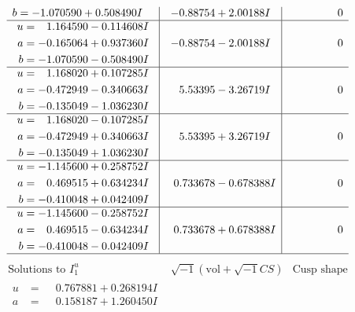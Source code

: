 \documentclass[1p]{elsarticle_modified}
\theoremstyle{definition}
\newcommand{\I}{\sqrt{-1}}
\begin{document}
$$\begin{array}{c|c|c}
\begin{aligned}
b &= -1.070590 + 0.508490 I\end{aligned}
 & -0.88754 + 2.00188 I & \phantom{-0.000000 } 0 \\ \hline\begin{aligned}
u &= \phantom{-}1.164590 - 0.114608 I \\
a &= -0.165064 + 0.937360 I \\
b &= -1.070590 - 0.508490 I\end{aligned}
 & -0.88754 - 2.00188 I & \phantom{-0.000000 } 0 \\ \hline\begin{aligned}
u &= \phantom{-}1.168020 + 0.107285 I \\
a &= -0.472949 - 0.340663 I \\
b &= -0.135049 - 1.036230 I\end{aligned}
 & \phantom{-}5.53395 - 3.26719 I & \phantom{-0.000000 } 0 \\ \hline\begin{aligned}
u &= \phantom{-}1.168020 - 0.107285 I \\
a &= -0.472949 + 0.340663 I \\
b &= -0.135049 + 1.036230 I\end{aligned}
 & \phantom{-}5.53395 + 3.26719 I & \phantom{-0.000000 } 0 \\ \hline\begin{aligned}
u &= -1.145600 + 0.258752 I \\
a &= \phantom{-}0.469515 + 0.634234 I \\
b &= -0.410048 + 0.042409 I\end{aligned}
 & \phantom{-}0.733678 - 0.678388 I & \phantom{-0.000000 } 0 \\ \hline\begin{aligned}
u &= -1.145600 - 0.258752 I \\
a &= \phantom{-}0.469515 - 0.634234 I \\
b &= -0.410048 - 0.042409 I\end{aligned}
 & \phantom{-}0.733678 + 0.678388 I & \phantom{-0.000000 } 0\\
 \hline 
 \end{array}$$\newpage$$\begin{array}{c|c|c}  
\text{Solutions to }I^u_{1}& \I (\text{vol} + \sqrt{-1}CS) & \text{Cusp shape}\\
 \hline 
\begin{aligned}
u &= \phantom{-}0.767881 + 0.268194 I \\
a &= \phantom{-}0.158187 + 1.260450 I \\

\end{aligned}
\end{array}$$
\end{document}
